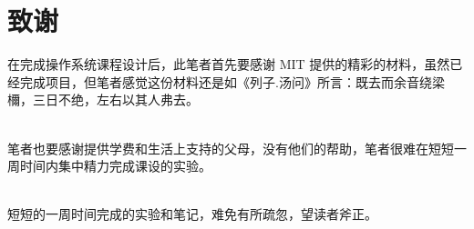 \chapter{致谢}

在完成操作系统课程设计后，此笔者首先要感谢 MIT 提供的精彩的材料，虽然已经完成项目，但笔者感觉这份材料还是如《列子.汤问》所言：既去而余音绕梁檷，三日不绝，左右以其人弗去。

~\\

笔者也要感谢提供学费和生活上支持的父母，没有他们的帮助，笔者很难在短短一周时间内集中精力完成课设的实验。

~\\

短短的一周时间完成的实验和笔记，难免有所疏忽，望读者斧正。


